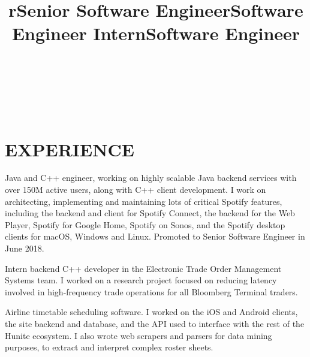 \documentclass[overlapped,12pt]{res}
\begin{document}
\begin{resume}

\begin{format}
\title{r}\\
\\
\body\\
\end{format}

\section{EXPERIENCE}
\title{Senior Software Engineer}
\begin{position}
Java and C++ engineer, working on highly scalable Java backend services with
over 150M active users, along with C++ client development. I work on
architecting, implementing and maintaining lots of critical Spotify features,
including the backend and client for Spotify Connect, the backend for the Web
Player, Spotify for Google Home, Spotify on Sonos, and the Spotify desktop
clients for macOS, Windows and Linux.
\tinylinebreak
Promoted to Senior Software Engineer in June 2018.
\end{position}

\title{Software Engineer Intern}
\begin{position}
Intern backend C++ developer in the Electronic Trade Order Management Systems
team. I worked on a research project focused on reducing latency involved in
high-frequency trade operations for all Bloomberg Terminal traders.
\end{position}

\title{Software Engineer}
\begin{position}
Airline timetable scheduling software. I worked on the iOS and Android clients,
the site backend and database, and the API used to interface with the rest of
the Hunite ecosystem. I also wrote web scrapers and parsers for data mining
purposes, to extract and interpret complex roster sheets.
\end{position}


\end{resume}
\end{document}
